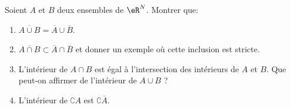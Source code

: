 \begin{exercice}\label{exoGeomAnal-0011}

 Soient $A$ et $B$ deux ensembles de $\eR^N$. Montrer que: 

 \begin{enumerate}
	 \item
		 $\overline{A \cup B} = \overline{A} \cup \overline{B} $. 
\item

 $\overline{A \cap B} \subset  \overline{A} \cap \overline{B} $ et donner un exemple où cette inclusion est stricte. 
\item
L'intérieur de $ A \cap B$ est égal à l'intersection des intérieurs de $A$ et $B$.  Que peut-on affirmer de l'intérieur de $A \cup B$ ? 
 \item
L'intérieur de $ \complement A $ est $ \complement \overline{A}$. 
		 
 \end{enumerate}


\end{exercice}
